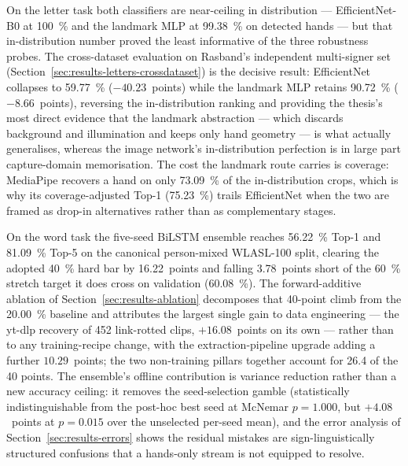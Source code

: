 On the letter task both classifiers are near-ceiling in distribution
--- EfficientNet-B0 at \SI{100}{\percent} and the landmark MLP at
\SI{99.38}{\percent} on detected hands --- but that in-distribution
number proved the least informative of the three robustness probes.
The cross-dataset evaluation on Rasband's independent multi-signer
set (Section~\ref{sec:results-letters-crossdataset}) is the decisive
result: EfficientNet collapses to \SI{59.77}{\percent}
($-40.23$~points) while the landmark MLP retains \SI{90.72}{\percent}
($-8.66$~points), reversing the in-distribution ranking and
providing the thesis's most direct evidence that the landmark
abstraction --- which discards background and illumination and keeps
only hand geometry --- is what actually generalises, whereas the
image network's in-distribution perfection is in large part
capture-domain memorisation. The cost the landmark route carries is
coverage: MediaPipe recovers a hand on only \SI{73.09}{\percent} of
the in-distribution crops, which is why its coverage-adjusted Top-1
(\SI{75.23}{\percent}) trails EfficientNet when the two are framed as
drop-in alternatives rather than as complementary stages.

On the word task the five-seed BiLSTM ensemble reaches
\SI{56.22}{\percent} Top-1 and \SI{81.09}{\percent} Top-5 on the
canonical person-mixed WLASL-100 split, clearing the adopted
\SI{40}{\percent} hard bar by 16.22~points and falling 3.78~points
short of the \SI{60}{\percent} stretch target it does cross on
validation (\SI{60.08}{\percent}). The forward-additive ablation of
Section~\ref{sec:results-ablation} decomposes that 40-point climb
from the \SI{20.00}{\percent} baseline and attributes the largest
single gain to data engineering --- the yt-dlp recovery of 452
link-rotted clips, $+16.08$~points on its own --- rather than to any
training-recipe change, with the extraction-pipeline upgrade adding a
further $10.29$~points; the two non-training pillars together account
for 26.4 of the 40 points. The ensemble's offline contribution is
variance reduction rather than a new accuracy ceiling: it removes the
seed-selection gamble (statistically indistinguishable from the
post-hoc best seed at McNemar $p = 1.000$, but $+4.08$~points at
$p = 0.015$ over the unselected per-seed mean), and the error
analysis of Section~\ref{sec:results-errors} shows the residual
mistakes are sign-linguistically structured confusions that a
hands-only stream is not equipped to resolve.

